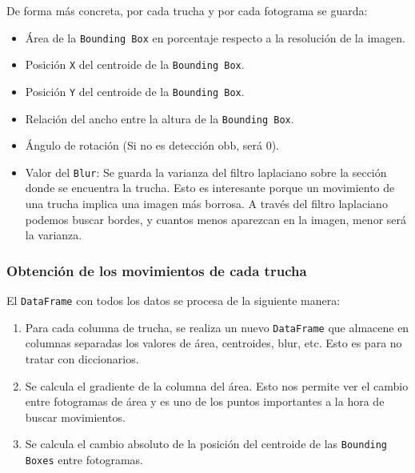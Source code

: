 \clearpage

De forma más concreta, por cada trucha y por cada fotograma se guarda:
\begin{itemize}
    \item Área de la \texttt{Bounding Box} en porcentaje respecto a la resolución de la imagen.
    \item Posición \texttt{X} del centroide de la \texttt{Bounding Box}.
    \item Posición \texttt{Y} del centroide de la \texttt{Bounding Box}.
    \item Relación del ancho entre la altura de la \texttt{Bounding Box}.
    \item Ángulo de rotación (Si no es detección \acrshort{obb}, será 0).
    \item Valor del \texttt{Blur}: Se guarda la varianza del filtro laplaciano sobre la sección donde se encuentra la trucha. Esto es interesante porque un movimiento de una trucha implica una imagen más borrosa. A través 
    del filtro laplaciano podemos buscar bordes, y cuantos menos aparezcan en la imagen, menor será la varianza.
\end{itemize}

\subsubsection{Obtención de los movimientos de cada trucha}

El \texttt{DataFrame} con todos los datos se procesa de la siguiente manera:
\begin{enumerate}
    \item Para cada columna de trucha, se realiza un nuevo \texttt{DataFrame} que almacene en columnas separadas los valores de área, centroides, blur, etc. Esto es para no tratar con diccionarios.
    \item Se calcula el gradiente de la columna del área. Esto nos permite ver el cambio entre fotogramas de área y es uno de los puntos importantes a la hora de buscar movimientos.
    \item Se calcula el cambio absoluto de la posición del centroide de las \texttt{Bounding Boxes} entre fotogramas.
\end{enumerate}

